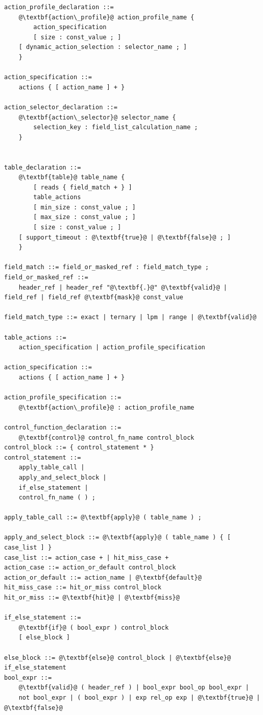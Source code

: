 \documentclass[12pt]{article}
\begin{document}
\begin{itemize}
\begin{lstlisting}[frame=single,backgroundcolor=\color{bnfgreen},escapechar=\@]
action_profile_declaration ::=
    @\textbf{action\_profile}@ action_profile_name {
        action_specification
        [ size : const_value ; ]
	[ dynamic_action_selection : selector_name ; ]
    }

action_specification ::=
    actions { [ action_name ] + }

action_selector_declaration ::=
    @\textbf{action\_selector}@ selector_name {
        selection_key : field_list_calculation_name ;
    }


table_declaration ::=
    @\textbf{table}@ table_name {
        [ reads { field_match + } ]
        table_actions
        [ min_size : const_value ; ]
        [ max_size : const_value ; ]
        [ size : const_value ; ]
	[ support_timeout : @\textbf{true}@ | @\textbf{false}@ ; ]
    }

field_match ::= field_or_masked_ref : field_match_type ;
field_or_masked_ref ::=
    header_ref | header_ref "@\textbf{.}@" @\textbf{valid}@ | field_ref | field_ref @\textbf{mask}@ const_value

field_match_type ::= exact | ternary | lpm | range | @\textbf{valid}@

table_actions ::=
    action_specification | action_profile_specification

action_specification ::=
    actions { [ action_name ] + }

action_profile_specification ::=
    @\textbf{action\_profile}@ : action_profile_name

control_function_declaration ::=
    @\textbf{control}@ control_fn_name control_block
control_block ::= { control_statement * }
control_statement ::=
    apply_table_call |
    apply_and_select_block |
    if_else_statement |
    control_fn_name ( ) ;

apply_table_call ::= @\textbf{apply}@ ( table_name ) ;

apply_and_select_block ::= @\textbf{apply}@ ( table_name ) { [ case_list ] }
case_list ::= action_case + | hit_miss_case +
action_case ::= action_or_default control_block
action_or_default ::= action_name | @\textbf{default}@
hit_miss_case ::= hit_or_miss control_block
hit_or_miss ::= @\textbf{hit}@ | @\textbf{miss}@

if_else_statement ::=
    @\textbf{if}@ ( bool_expr ) control_block
    [ else_block ]

else_block ::= @\textbf{else}@ control_block | @\textbf{else}@ if_else_statement
bool_expr ::=
    @\textbf{valid}@ ( header_ref ) | bool_expr bool_op bool_expr |
    not bool_expr | ( bool_expr ) | exp rel_op exp | @\textbf{true}@ | @\textbf{false}@


\end{lstlisting}
\end{itemize}
\end{document}

